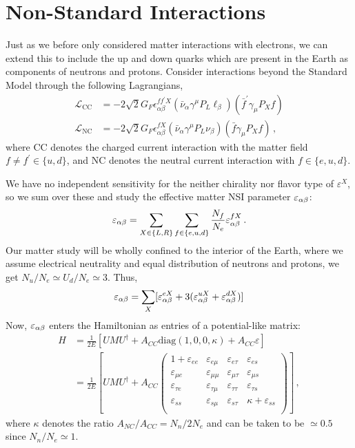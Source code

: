 \documentclass[twocolumn]{article}
\begin{document}
\section{Non-Standard Interactions}
Just as we before only considered matter interactions with electrons, we can extend this to include the up and down quarks which are present in the Earth as components of neutrons and protons. 
Consider interactions beyond the Standard Model through the following Lagrangians,
\begin{align*}
    \mathcal{L}_{\mathrm{CC}} &= -2 \sqrt{2} G_{F} \epsilon_{\alpha \beta}^{f f^{\prime} X}\left(\bar{\nu}_{\alpha} \gamma^{\mu} P_{L} \ell_{\beta}\right)\left(\bar{f}^{\prime} \gamma_{\mu} P_{X} f\right) \\
    \mathcal{L}_{\mathrm{NC}} &= -2 \sqrt{2} G_{F} \epsilon_{\alpha \beta}^{f X}\left(\bar{\nu}_{\alpha} \gamma^{\mu} P_{L} \nu_{\beta}\right)\left(\bar{f} \gamma_{\mu} P_{X} f\right)\,,
\end{align*}
where CC denotes the charged current interaction with the matter field $f\neq f^\prime \in \{u,d\}$, and NC denotes the neutral current interaction with $f \in \{e,u,d\}$. 

We have no independent sensitivity for the neither chirality nor flavor type of $\varepsilon^X$, so we sum over these and study the effective matter NSI parameter $\varepsilon_{\alpha\beta}$:
\begin{align}
    \varepsilon_{\alpha\beta} = \sum_{X \in \{L,R\}} \sum_{f \in \{e,u,d\}} \frac{N_f}{N_e} \varepsilon^{fX}_{\alpha\beta}\,.
\end{align}
Our matter study will be wholly confined to the interior of the Earth, where we assume electrical neutrality and equal distribution of neutrons and protons, we get $N_u/N_e \simeq U_d/N_e \simeq 3$. Thus,
\begin{align}
    \varepsilon_{\alpha\beta} =  \sum_X [\varepsilon_{\alpha\beta}^{eX} + 3(\varepsilon_{\alpha\beta}^{uX} + \varepsilon_{\alpha\beta}^{dX})]
\end{align}
Now, $\varepsilon_{\alpha\beta}$ enters the Hamiltonian as entries of a potential-like matrix:
\begin{align}\label{eq:NSIH}
    H &= \frac{1}{2E} \left[UMU^\dagger + A_{CC}\text{diag}(1,0,0,\kappa) + A_{CC} \varepsilon \right] \nonumber \\
      &= \frac{1}{2E} \left[UMU^\dagger + A_{CC}
      \begin{pmatrix}
          1 + \varepsilon_{ee} & \varepsilon_{e\mu} & \varepsilon_{e\tau} & \varepsilon_{es} \\
          \varepsilon_{\mu e} & \varepsilon_{\mu\mu} & \varepsilon_{\mu\tau} & \varepsilon_{\mu s} \\
          \varepsilon_{\tau e} & \varepsilon_{\tau\mu} & \varepsilon_{\tau\tau} & \varepsilon_{\tau s} \\
          \varepsilon_{ss} & \varepsilon_{s\mu} & \varepsilon_{s\tau} & \kappa+\varepsilon_{ss} \\
      \end{pmatrix} \right]\,, 
\end{align}
where $\kappa$ denotes the ratio $A_{NC}/A_{CC} = N_n/2N_e$ and can be taken to be $\simeq 0.5$ since $N_n/N_e\simeq 1$. 
\end{document}

